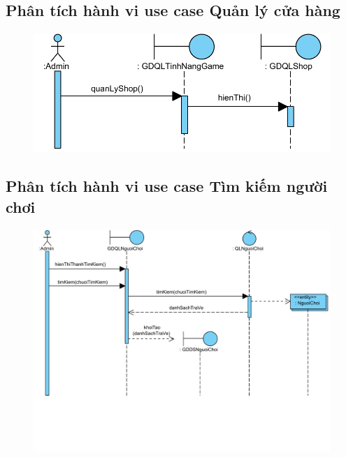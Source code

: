 \documentclass[3p]{elsarticle}
\begin{document}
\subsection{Phân tích hành vi use case Quản lý cửa hàng}
\begin{figure}[!htbp]
	\hspace*{-.5in}
	\centering
	\includegraphics[scale=.55]{images/sequence-pdfs/admin/manageShop.pdf}
\end{figure}
\newpage

\subsection{Phân tích hành vi use case Tìm kiếm người chơi}
\begin{figure}[!htbp]
	\hspace*{-.5in}
	\centering
	\includegraphics[scale=.55]{images/sequence-pdfs/admin/searchPlayer.pdf}
\end{figure}
\newpage
\end{document}
